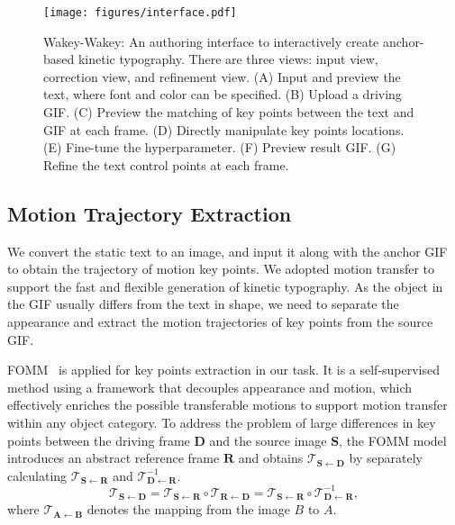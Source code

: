 \begin{figure*}[t!]
  \centering
  \texttt{[image: figures/interface.pdf]}
  \caption{Wakey-Wakey: An authoring interface to interactively create anchor-based kinetic typography. There are three views: input view, correction view, and refinement view. (A) Input and preview the text, where font and color can be specified. (B) Upload a driving GIF. (C) Preview the matching of key points between the text and GIF at each frame. (D) Directly manipulate key points locations. (E) Fine-tune the hyperparameter. (F) Preview result GIF. (G) Refine the text control points at each frame. }
  \label{fig: interface}
\end{figure*}
\subsection{Motion Trajectory Extraction}
\label{subsec: fomm}
     We convert the static text to an image, and input it along with the anchor GIF to obtain the trajectory of motion key points. We adopted motion transfer to support the fast and flexible generation of kinetic typography.
As the object in the GIF usually differs from the text in shape, we need to separate the appearance and extract the motion trajectories of key points from the source GIF.

FOMM~\cite{siarohin2019first} is applied for key points extraction in our task. It is a self-supervised method using a framework that decouples appearance and motion, which effectively enriches the possible transferable motions to support motion transfer within any object category.
To address the problem of large differences in key points between the driving frame $\mathbf{D}$ and the source image $\mathbf{S}$, the FOMM model introduces an abstract reference frame $\mathbf{R}$ and obtains $\mathcal{T}_{\mathbf{S}\leftarrow \mathbf{D}}$ by separately calculating $\mathcal{T}_{\mathbf{S}\leftarrow \mathbf{R}}$ and $\mathcal{T}_{\mathbf{D}\leftarrow \mathbf{R}}^{-1}$.
$$
\mathcal{T}_{\mathbf{S} \leftarrow \mathbf{D}}=\mathcal{T}_{\mathbf{S} \leftarrow \mathbf{R}} \circ \mathcal{T}_{\mathbf{R} \leftarrow \mathbf{D}}=\mathcal{T}_{\mathbf{S} \leftarrow \mathbf{R}} \circ \mathcal{T}_{\mathbf{D} \leftarrow \mathbf{R}}^{-1},
$$
where $\mathcal{T}_{\mathbf{A}\leftarrow \mathbf{B}}$ denotes the mapping from the image $B$ to $A$.

